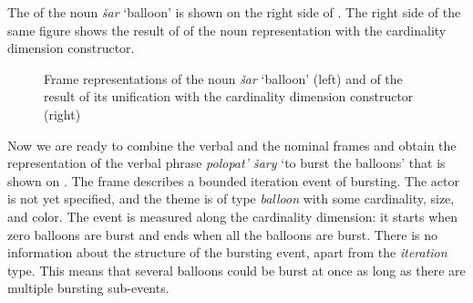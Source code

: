 The  of the noun \textit{\v{s}ar} `balloon' is shown on the right side of . The right side of the same figure shows the result of  of the noun representation with the cardinality dimension constructor.

\begin{figure}
\hfill%
\caption{Frame representations of the noun  \textit{\v{s}ar} `balloon' (left) and of the result of its unification with the cardinality dimension constructor (right) \label{frame:balloon}}
\end{figure}

Now we are ready to combine the verbal and the nominal frames and obtain the representation of the verbal phrase \textit{polopat' \v{s}ary} `to burst the balloons' that is shown on . The frame describes a bounded iteration event of bursting. The actor is not yet specified, and the theme is of type \textit{balloon} with some cardinality, size, and color. The event is measured along the cardinality dimension: it starts when zero balloons are burst and ends when all the balloons are burst. There is no information about the  structure of the bursting event, apart from the \textit{iteration} type. This means that several balloons could be burst at once as long as there are multiple bursting sub-events.

